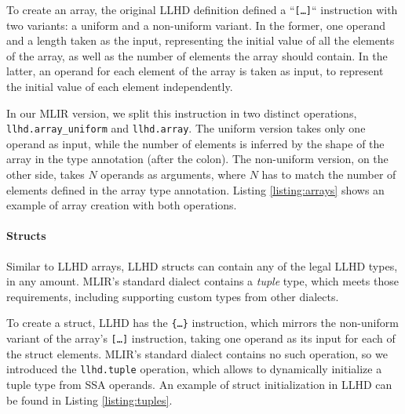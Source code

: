To create an array, the original LLHD definition defined a “\texttt{[\ldots]}“ instruction with two variants: a uniform and a non-uniform variant. In the former, one operand and a length taken as the input, representing the initial value of all the elements of the array, as well as the number of elements the array should contain. In the latter, an operand for each element of the array is taken as input, to represent the initial value of each element independently.

In our MLIR version, we split this instruction in two distinct operations, \texttt{llhd.array\_uniform} and \texttt{llhd.array}. The uniform version takes only one operand as input, while the number of elements is inferred by the shape of the array in the type annotation (after the colon). The non-uniform version, on the other side, takes $N$ operands as arguments, where $N$ has to match the number of elements defined in the array type annotation. Listing \ref{listing:arrays} shows an example of array creation with both operations.


\paragraph{Structs}
Similar to LLHD arrays, LLHD structs can contain any of the legal LLHD types, in any amount. MLIR's standard dialect contains a \textit{tuple} type, which meets those requirements, including supporting custom types from other dialects.

To create a struct, LLHD has the \texttt{\{\ldots\}} instruction, which mirrors the non-uniform variant of the array's \texttt{[\ldots]} instruction, taking one operand as its input for each of the struct elements. MLIR's standard dialect contains no such operation, so we introduced the \texttt{llhd.tuple} operation, which allows to dynamically initialize a tuple type from SSA operands. An example of struct initialization in LLHD can be found in Listing \ref{listing:tuples}.


